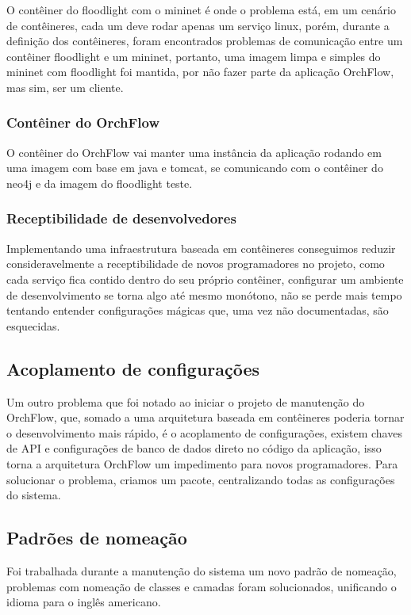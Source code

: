 \documentclass[
	article,			%
	11pt,				%
	oneside,			%
	a4paper,			%
	english,			%
	brazil,				%
	sumario=tradicional
	]{abntex2}
\begin{document}
O contêiner do floodlight com o mininet é onde o problema está, em um cenário de contêineres, cada um deve rodar apenas um serviço linux, porém, durante a definição dos contêineres, foram encontrados problemas de comunicação entre um contêiner floodlight e um mininet, portanto, uma imagem limpa e simples do mininet com floodlight foi mantida, por não fazer parte da aplicação OrchFlow, mas sim, ser um cliente.

\subsubsection{Contêiner do OrchFlow}

O contêiner do OrchFlow vai manter uma instância da aplicação rodando em uma imagem com base em java e tomcat, se comunicando com o contêiner do neo4j e da imagem do floodlight teste.

\subsubsection{Receptibilidade de desenvolvedores}

Implementando uma infraestrutura baseada em contêineres conseguimos reduzir consideravelmente a receptibilidade de novos programadores no projeto, como cada serviço fica contido dentro do seu próprio contêiner, configurar um ambiente de desenvolvimento se torna algo até mesmo monótono, não se perde mais tempo tentando entender configurações mágicas que, uma vez não documentadas, são esquecidas.

\subsection{Acoplamento de configurações}

Um outro problema que foi notado ao iniciar o projeto de manutenção do OrchFlow, que, somado a uma arquitetura baseada em contêineres poderia tornar o desenvolvimento mais rápido, é o acoplamento de configurações, existem chaves de API e configurações de banco de dados direto no código da aplicação, isso torna a arquitetura OrchFlow um impedimento para novos programadores.
Para solucionar o problema, criamos um pacote, centralizando todas as configurações do sistema.

\subsection{Padrões de nomeação}

Foi trabalhada durante a manutenção do sistema um novo padrão de nomeação, problemas com nomeação de classes e camadas foram solucionados, unificando o idioma para o inglês americano.
\end{document}
